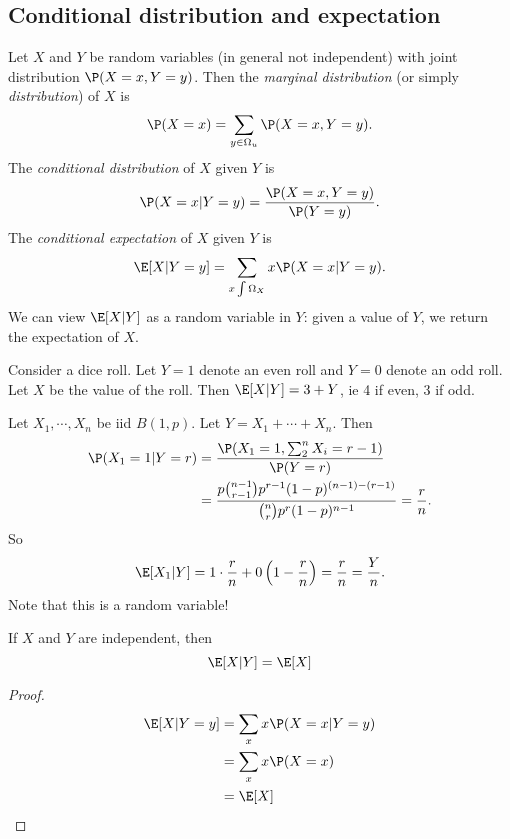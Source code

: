 \documentclass[a4paper]{article}
\begin{document}
\subsection{Conditional distribution and expectation}
\begin{defi}
  Let $X$ and $Y$ be random variables (in general not independent) with joint distribution $\P(X = x, Y = y)$. Then the \emph{marginal distribution} (or simply \emph{distribution}) of $X$ is
  \[
    \P(X = x) = \sum_{y\in \Omega_u}\P(X = x, Y = y).
  \]
  The \emph{conditional distribution} of $X$ given $Y$ is
  \[
    \P(X = x|Y = y) = \frac{\P(X = x, Y = y)}{\P(Y = y)}.
  \]
  The \emph{conditional expectation} of $X$ given $Y$ is
  \[
    \E[X|Y = y] = \sum_{x\int \Omega_X}x\P(X = x|Y = y).
  \]
  We can view $\E[X|Y]$ as a random variable in $Y$: given a value of $Y$, we return the expectation of $X$.
\end{defi}

\begin{eg}
  Consider a dice roll. Let $Y = 1$ denote an even roll and $Y = 0$ denote an odd roll. Let $X$ be the value of the roll. Then $\E[X|Y] = 3 + Y$, ie 4 if even, 3 if odd.
\end{eg}

\begin{eg}
  Let $X_1, \cdots, X_n$ be iid $B(1, p)$. Let $Y = X_1 + \cdots + X_n$. Then
  \begin{align*}
    \P(X_1 = 1|Y = r) &= \frac{\P(X_1 = 1, \sum_{2}^n X_i = r - 1)}{\P(Y = r)}\\
    &= \frac{p\binom{n - 1}{r - 1}p^{r - 1}(1 - p)^{(n - 1) - (r - 1)}}{\binom{n}{r} p^r (1 - p)^{n - 1}} = \frac{r}{n}.
  \end{align*}
  So
  \[
    \E[X_1|Y] = 1 \cdot \frac{r}{n} + 0\left(1 - \frac{r}{n}\right) = \frac{r}{n} = \frac{Y}{n}.
  \]
  Note that this is a random variable!
\end{eg}

\begin{thm}
  If $X$ and $Y$ are independent, then
  \[
    \E[X|Y] = \E[X]
  \]
\end{thm}

\begin{proof}
  \begin{align*}
    \E[X|Y = y] &= \sum_{x}x\P(X = x|Y = y)\\
    &= \sum_x x\P(X = x)\\
    &= \E[X]
  \end{align*}
\end{proof}
\end{document}
